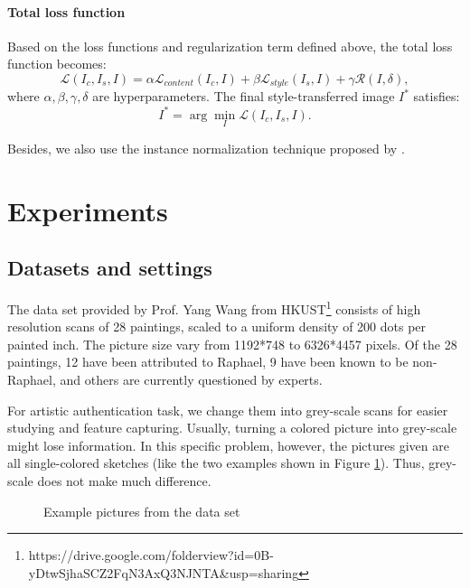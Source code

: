 \documentclass{article}
\begin{document}
\paragraph{Total loss function}

Based on the loss functions and regularization term defined above, the total loss function becomes:
\begin{equation}
\mathcal{L}(I_c,I_s,I) = \alpha\mathcal{L}_{content}(I_c,I)
+ \beta\mathcal{L}_{style}(I_s,I) + \gamma\mathcal{R}(I,\delta),
\end{equation}
where $\alpha,\beta,\gamma,\delta$ are hyperparameters. The final style-transferred image $I^*$ satisfies:
\begin{equation}
I^* = \arg\min_{I}\mathcal{L}(I_c,I_s,I).
\end{equation}

Besides, we also use the instance normalization technique proposed by \citet{ulyanov2017improved}.

\section{Experiments}


\subsection{Datasets and settings}

The data set provided by Prof. Yang Wang from HKUST\footnote{https://drive.google.com/folderview?id=0B-yDtwSjhaSCZ2FqN3AxQ3NJNTA\&usp=sharing} consists of high resolution scans of 28 paintings, scaled to a uniform density of 200 dots per painted inch. The picture size vary from 1192*748 to 6326*4457 pixels. 
Of the 28 paintings, 12 have been attributed to Raphael, 9 have been known to be non-Raphael, and others are currently questioned by experts. 

For artistic authentication task, we change them into grey-scale scans for easier studying and feature capturing. Usually, turning a colored picture into grey-scale might lose information. In this specific problem, however, the pictures given are all single-colored sketches (like the two examples shown in Figure \ref{fig:data-example}). Thus, grey-scale does not make much difference.

\begin{figure}[htb]
\centering
{}
\quad
{}
\caption{Example pictures from the data set}
\label{fig:data-example}
\end{figure}
\end{document}
